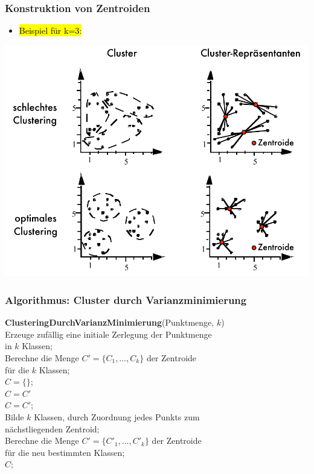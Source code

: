 \begin{frame}
\frametitle{Konstruktion von Zentroiden}

\begin{itemize}
\item \hl{Beispiel für k=3:}
\end{itemize} 


\begin{center}
\includegraphics[scale=.5]{fig7/zentroiden-bsp.pdf}
\end{center}

\end{frame}


\begin{frame}
\frametitle{Algorithmus: Cluster durch  Varianzminimierung}

\begin{algo}
\textbf{ClusteringDurchVarianzMinimierung}(Punktmenge, $k$) \\
\1 \textrm{Erzeuge zufällig eine initiale Zerlegung der Punktmenge} \\
\2 \textrm{in $k$ Klassen;} \\
\1 \textrm{Berechne die Menge} $C'=\{C_1, \dots, C_k\}$ \textrm{der Zentroide} \\
\2 \textrm{für die $k$ Klassen;}  \\
\1 $C = \{\}$; \\
\1  $C = C'$ \\
\2 $C = C'$; \\
\2 \textrm{Bilde $k$ Klassen, durch Zuordnung jedes Punkts zum} \\
\3 \textrm{nächstliegenden Zentroid;}   \\ 
\2 \textrm{Berechne die Menge} $C'= \{C'_1, \dots, C'_k\}$ \textrm{der Zentroide} \\
\3 \textrm{für die neu bestimmten Klassen;} \\
\1  $C$; \\
\end{algo}
\end{frame}

